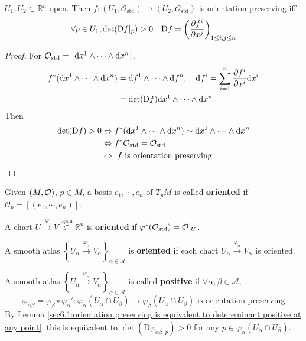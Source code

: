 
\begin{lemma}\label{sec6.1:orientation preserving is equivalent to detereminant positive at any point}
    $ U_1,U_2\subset \mathbb R^n $ open. Then  $ f:(U_1,\mathcal{O}_{\mathrm{std}})\rightarrow(U_2,\mathcal{O}_{\mathrm{std}}) $ is orientation preserving iff 
   \begin{equation*}
       \forall p\in  U_1,\det(\mathrm{D}f|_p)>0\quad \mathrm{D}f=\left(\displaystyle\frac{\partial f^i}{\partial x^j}\right)_{1 \leq i,j \leq n}
   \end{equation*} 
\end{lemma}
\begin{proof}
   For  $ \mathcal{O}_{\mathrm{std}}=\left[\mathrm{d} x^1\wedge\cdots\wedge\mathrm{d} x^n\right] $,
   \begin{equation*}
       \begin{aligned}
           f^*(\mathrm{d} {x}^1\wedge\cdots\wedge\mathrm{d} {x}^n)&=\mathrm{d} {f}^1\wedge\cdots\wedge\mathrm{d} {f}^n,\quad \mathrm{d} f^i=\sum_{i=1}^n\frac{\partial f^i}{\partial x^i}\mathrm{d} x^i\\
           &=\det(\mathrm{D}f)\mathrm{d} {x}^1\wedge\cdots\wedge\mathrm{d} {x}^n
       \end{aligned}
   \end{equation*} 
   Then 
   \begin{equation*}
       \begin{aligned}
           \det(\mathrm{D}f)>0&\Leftrightarrow f^*(\mathrm{d} {x}^1\wedge\cdots\wedge\mathrm{d} {x}^n)\sim\mathrm{d} {x}^1\wedge\cdots\wedge\mathrm{d} {x}^n\\
           &\Leftrightarrow f^*\mathcal{O}_{\mathrm{std}}=\mathcal{O}_{\mathrm{std}}\\
           &\Leftrightarrow\text{ $ f $ is orientation preserving }
       \end{aligned}
   \end{equation*}
\end{proof}
Given  $ (M,\mathcal O) $,  $ p\in M $, a basis  $ e_1,\cdots,e_n $ of  $ T_pM $ is called \textbf{oriented} if  $ \mathcal{O}_p=[(e_1,\cdots,e_n)] $.

A chart  $ U\xrightarrow{\varphi}V\overset{\text{open}}{\subset}\mathbb{R}^n $ is \textbf{oriented} if  $ \varphi^*(\mathcal{O}_{\mathrm{std}})=\mathcal{O}|_U $.

A smooth atlas  $ \left\{U_\alpha\xrightarrow{\varphi_\alpha}V_\alpha\right\}_{\alpha\in\mathcal{A}} $ is \textbf{oriented} if each chart  $ U_\alpha\xrightarrow{\varphi_\alpha}V_\alpha $ is oriented.

A smooth atlas  $ \left\{U_\alpha\xrightarrow{\varphi_\alpha}V_\alpha\right\}_{\alpha\in\mathcal{A}}  $ is called \textbf{positive} if  $ \forall \alpha,\beta\in\mathcal{A} $,
\[\varphi_{\alpha\beta}=\varphi_\beta\circ\varphi_\alpha':\varphi_\alpha(U_\alpha\cap U_\beta)\rightarrow\varphi_\beta(U_\alpha\cap U_\beta)\text{ is orientation preserving}\] 
By Lemma \ref{sec6.1:orientation preserving is equivalent to detereminant positive at any point}, this is equivalent to  $ \det(\mathrm{D}\varphi_{\alpha\beta}|_p)>0 $ for any  $ p\in \varphi_\alpha(U_\alpha\cap U_\beta) $.

